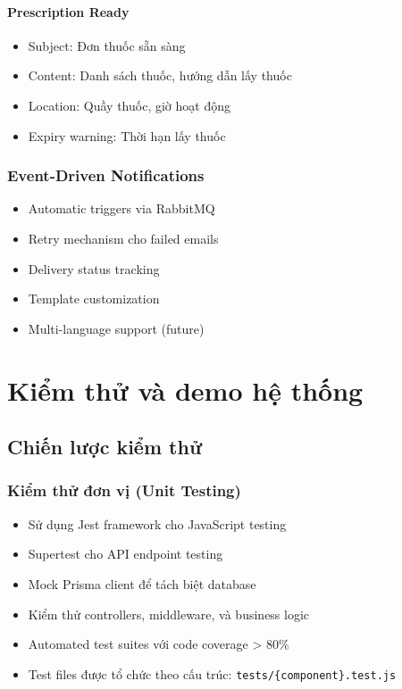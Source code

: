 \documentclass[12pt,a4paper]{report}
\begin{document}
\subsubsection{Prescription Ready}
\begin{itemize}
    \item Subject: Đơn thuốc sẵn sàng
    \item Content: Danh sách thuốc, hướng dẫn lấy thuốc
    \item Location: Quầy thuốc, giờ hoạt động
    \item Expiry warning: Thời hạn lấy thuốc
\end{itemize}

\subsection{Event-Driven Notifications}
\begin{itemize}
    \item Automatic triggers via RabbitMQ
    \item Retry mechanism cho failed emails
    \item Delivery status tracking
    \item Template customization
    \item Multi-language support (future)
\end{itemize}

\chapter{Kiểm thử và demo hệ thống}

\section{Chiến lược kiểm thử}

\subsection{Kiểm thử đơn vị (Unit Testing)}
\begin{itemize}
    \item Sử dụng Jest framework cho JavaScript testing
    \item Supertest cho API endpoint testing
    \item Mock Prisma client để tách biệt database
    \item Kiểm thử controllers, middleware, và business logic
    \item Automated test suites với code coverage > 80\%
    \item Test files được tổ chức theo cấu trúc: \texttt{tests/\{component\}.test.js}
\end{itemize}
\end{document}
